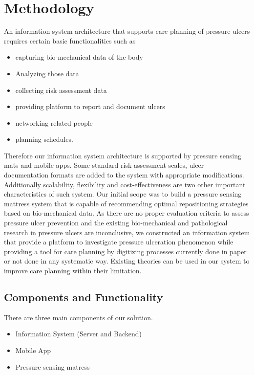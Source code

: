 \chapter{Methodology}
\label{chapter:method}

An information system architecture that supports care planning of pressure ulcers requires certain basic functionalities such as 
\begin{itemize}
	\item capturing bio-mechanical data of the body
	\item Analyzing those data
	\item collecting risk assessment data
	\item providing platform to report and document ulcers
	\item networking related people
	\item planning schedules.
\end{itemize}

Therefore our information system architecture is supported by pressure sensing mats and mobile apps. Some standard risk assessment scales, ulcer documentation formats are added to the system with appropriate modifications. Additionally scalability, flexibility and cost-effectiveness are two other important characteristics of such system. Our initial scope was to build a pressure sensing mattress system that is capable of recommending optimal repositioning strategies based on bio-mechanical data. As there are no proper evaluation criteria to assess pressure ulcer  prevention and the existing bio-mechanical and pathological research in pressure ulcers are inconclusive, we constructed an information system that provide a platform to investigate pressure ulceration phenomenon while providing a tool for care planning by digitizing processes currently done in paper or not done in any systematic way. Existing theories can be used in our system to improve care planning within their limitation.

\section{Components and Functionality}

There are three main components of our solution. 
\begin{itemize}
	\item Information System (Server and Backend)
	\item Mobile App
	\item Pressure sensing matress
\end{itemize}

